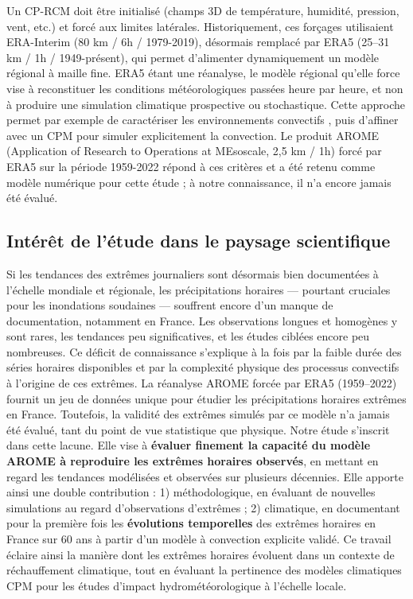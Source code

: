 \documentclass[
  article,
  nofooter,
  noheadings]{jss}
\begin{document}
Un CP-RCM doit être initialisé (champs 3D de température, humidité,
pression, vent, etc.) et forcé aux limites latérales. Historiquement,
ces forçages utilisaient ERA-Interim (80 km / 6h / 1979-2019), désormais
remplacé par ERA5 (25--31 km / 1h / 1949-présent), qui permet
d'alimenter dynamiquement un modèle régional à maille fine. ERA5 étant
une réanalyse, le modèle régional qu'elle force vise à reconstituer les
conditions météorologiques passées heure par heure, et non à produire
une simulation climatique prospective ou stochastique. Cette approche
permet par exemple de caractériser les environnements convectifs
\citep{ecmwf_era5_data_documentation}, puis d'affiner avec un CPM pour
simuler explicitement la convection. Le produit AROME (Application of
Research to Operations at MEsoscale, 2,5 km / 1h) forcé par ERA5 sur la
période 1959-2022 répond à ces critères et a été retenu comme modèle
numérique pour cette étude ; à notre connaissance, il n'a encore jamais
été évalué.

\subsection{Intérêt de l'étude dans le paysage
scientifique}\label{intuxe9ruxeat-de-luxe9tude-dans-le-paysage-scientifique}

Si les tendances des extrêmes journaliers sont désormais bien
documentées à l'échelle mondiale et régionale, les précipitations
horaires --- pourtant cruciales pour les inondations soudaines ---
souffrent encore d'un manque de documentation, notamment en France. Les
observations longues et homogènes y sont rares, les tendances peu
significatives, et les études ciblées encore peu nombreuses. Ce déficit
de connaissance s'explique à la fois par la faible durée des séries
horaires disponibles et par la complexité physique des processus
convectifs à l'origine de ces extrêmes. La réanalyse AROME forcée par
ERA5 (1959--2022) fournit un jeu de données unique pour étudier les
précipitations horaires extrêmes en France. Toutefois, la validité des
extrêmes simulés par ce modèle n'a jamais été évalué, tant du point de
vue statistique que physique. Notre étude s'inscrit dans cette lacune.
Elle vise à \textbf{évaluer finement la capacité du modèle AROME à
reproduire les extrêmes horaires observés}, en mettant en regard les
tendances modélisées et observées sur plusieurs décennies. Elle apporte
ainsi une double contribution : 1) méthodologique, en évaluant de
nouvelles simulations au regard d'observations d'extrêmes ; 2)
climatique, en documentant pour la première fois les \textbf{évolutions
temporelles} des extrêmes horaires en France sur 60 ans à partir d'un
modèle à convection explicite validé. Ce travail éclaire ainsi la
manière dont les extrêmes horaires évoluent dans un contexte de
réchauffement climatique, tout en évaluant la pertinence des modèles
climatiques CPM pour les études d'impact hydrométéorologique à l'échelle
locale.
\end{document}
